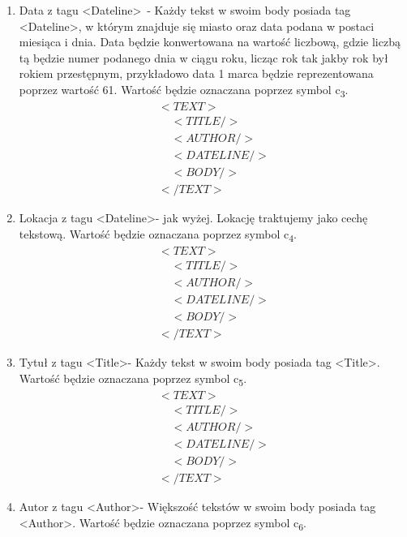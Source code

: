 \documentclass{classrep}
\begin{document}
\begin{enumerate}
 \item Data z tagu  \textless Dateline\textgreater\ - Każdy tekst w swoim body posiada tag \textless Dateline\textgreater , w którym znajduje się miasto oraz data podana w postaci miesiąca i dnia. Data będzie konwertowana na wartość liczbową, gdzie liczbą tą będzie numer podanego dnia w ciągu roku, licząc rok tak jakby rok był rokiem przestępnym, przykładowo data 1 marca będzie reprezentowana poprzez wartość 61. Wartość będzie oznaczana poprzez symbol  c\textsubscript{3}.    \begin{equation}
  \begin{array}{l}
  <TEXT> \\
\;\;\;\; <TITLE/>\\
\;\;\;\; <AUTHOR/>\\
\;\;\;\; <DATELINE/>\\
 \;\;\;\;<BODY/> \\
</TEXT>
  \end{array}
\end{equation}
  \item Lokacja z tagu \textless Dateline\textgreater - jak wyżej. Lokację traktujemy jako cechę tekstową. Wartość będzie oznaczana poprzez symbol  c\textsubscript{4}.     \begin{equation}
  \begin{array}{l}
  <TEXT> \\
\;\;\;\; <TITLE/>\\
\;\;\;\; <AUTHOR/>\\
\;\;\;\; <DATELINE/>\\
 \;\;\;\;<BODY/> \\
</TEXT>
  \end{array}
\end{equation}
  \item Tytuł z tagu \textless Title\textgreater - Każdy tekst w swoim body posiada tag \textless Title\textgreater. Wartość będzie oznaczana poprzez symbol  c\textsubscript{5}.   \begin{equation}
  \begin{array}{l}
  <TEXT> \\
\;\;\;\; <TITLE/>\\
\;\;\;\; <AUTHOR/>\\
\;\;\;\; <DATELINE/>\\
 \;\;\;\;<BODY/> \\
</TEXT>
  \end{array}
\end{equation}
  \item Autor z tagu \textless Author\textgreater - Większość tekstów w swoim body posiada tag \textless Author\textgreater. Wartość będzie oznaczana poprzez symbol  c\textsubscript{6}.  \begin{equation}

\end{equation}
\end{enumerate}
\end{document}
